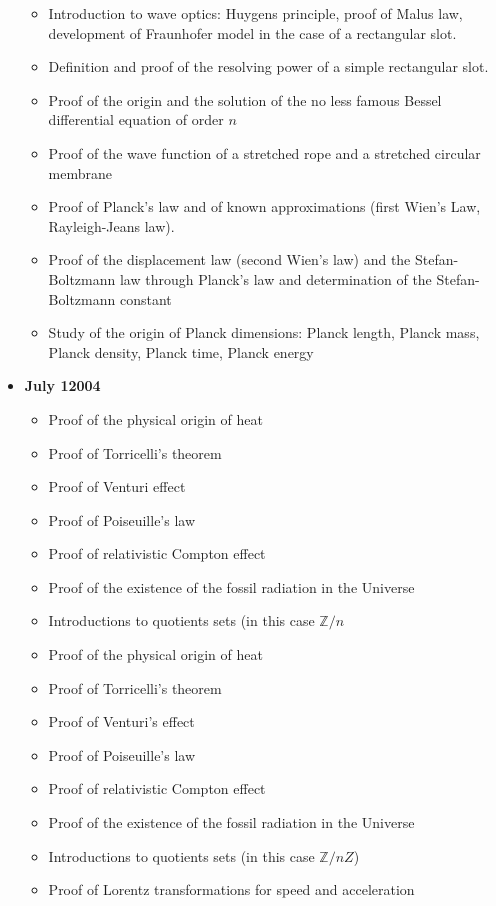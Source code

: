 \begin{itemize}
\begin{itemize}[noitemsep]
			\item Introduction to wave optics: Huygens principle, proof of Malus law, development of Fraunhofer model in the case of a rectangular slot. 
			\item Definition and proof of the resolving power of a simple rectangular slot.
			\item Proof of the origin and the solution of the no less famous Bessel differential equation of order $n$
			\item Proof of the wave function of a stretched rope and a stretched circular membrane
			\item Proof of Planck's law and of known approximations (first Wien's Law, Rayleigh-Jeans law).
			\item Proof of the displacement law (second Wien's law) and the Stefan-Boltzmann law through Planck's law and determination of the Stefan-Boltzmann constant
			\item Study of the origin of Planck dimensions: Planck length, Planck mass, Planck density, Planck time, Planck energy
		\end{itemize}
	\item \textbf{July 12004}
		\begin{itemize}[noitemsep]
			\item Proof of the physical origin of heat
			\item Proof of Torricelli's theorem
			\item Proof of Venturi effect
			\item Proof of Poiseuille's law
			\item Proof of relativistic Compton effect
			\item Proof of the existence of the fossil radiation in the Universe
			\item Introductions to quotients sets (in this case $\mathbb{Z}/n$
			\item Proof of the physical origin of heat
			\item Proof of Torricelli's theorem
			\item Proof of Venturi's effect
			\item Proof of Poiseuille's law
			\item Proof of relativistic Compton effect
			\item Proof of the existence of the fossil radiation in the Universe
			\item Introductions to quotients sets (in this case $\mathbb{Z}/nZ$)
			\item Proof of Lorentz transformations for speed and acceleration

\end{itemize}
\end{itemize}

